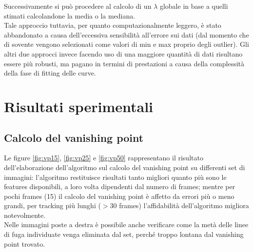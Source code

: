 \documentclass[12pt]{report}
\begin{document}
\noindent Successivamente si pu\`o procedere al calcolo di un $\lambda$ globale in base a quelli stimati calcolandone la media o la mediana.\\

\noindent Tale approccio tuttavia, per quanto computazionalmente leggero, \`e stato abbandonato a causa dell'eccessiva sensibilit\`a all'errore sui dati (dal momento che di sovente vengono selezionati come valori di min e max proprio degli outlier). Gli altri due approcci invece facendo uso di una maggiore quantit\`a di dati risultano essere pi\`u robusti, ma pagano in termini di prestazioni a causa della complessit\`a della fase di fitting delle curve.




\chapter{Risultati sperimentali}

\section{Calcolo del vanishing point}

\noindent Le figure \ref{fig:vp15}, \ref{fig:vp25} e \ref{fig:vp50} rappresentano il risultato dell'elaborazione dell'algoritmo sul calcolo del vanishing point su differenti set di immagini: l'algoritmo restituisce risultati tanto migliori quanto pi\`u sono le features disponibili, a loro volta dipendenti dal numero di frames; mentre per pochi frames (15) il calcolo del vanishing point \`e affetto da errori pi\`u o meno grandi, per tracking pi\`u lunghi ($>30$ frames) l'affidabilit\`a dell'algoritmo migliora notevolmente.\\

\noindent Nelle immagini poste a destra \`e possibile anche verificare come la met\`a delle linee di fuga individuate venga eliminata dal set, perch\'e troppo lontana dal vanishing point trovato.\\

\newcommand{\imTrackScale}{0.6}
\end{document}
